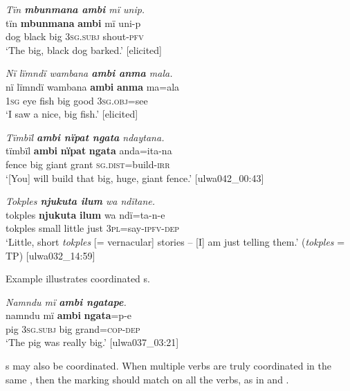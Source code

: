 \ea%
    \label{ex:complex:13}
          \textit{Tïn \textbf{mbunmana ambi} mï unip.}\\
\gll    tïn    \textbf{mbunmana}  \textbf{ambi}  mï      uni-p\\
    dog  black      big    3\textsc{sg.subj}  shout-\textsc{pfv}\\
\glt `The big, black dog barked.’ [elicited]
\z

\ea%
    \label{ex:complex:14}
          \textit{Nï lïmndï wambana \textbf{ambi anma} mala.}\\
\gll    nï    lïmndï  wambana  \textbf{ambi}  \textbf{anma}  ma=ala\\
    1\textsc{sg}  eye    fish    big    good  3\textsc{sg.obj}=see\\
\glt `I saw a nice, big fish.’ [elicited]
\z

\ea%
    \label{ex:complex:15}
          \textit{Tïmbïl \textbf{ambi nïpat ngata} ndaytana.}\\
\gll    tïmbïl  \textbf{ambi}  \textbf{nïpat}  \textbf{ngata}  anda=ita-na\\
    fence  big    giant  grant  \textsc{sg.dist}=build-\textsc{irr}\\
\glt `[You] will build that big, huge, giant fence.’ [ulwa042\_00:43]
\z

\ea%
    \label{ex:complex:16}
          \textit{Tokples \textbf{njukuta ilum} wa ndïtane.}\\
\gll    tokples  \textbf{njukuta}  \textbf{ilum}  wa  ndï=ta-n-e\\
    tokples  small    little  just  3\textsc{pl}=say-\textsc{ipfv-dep}\\
\glt `Little, short \textit{tokples} [= vernacular] stories -- [I] am just telling them.’ (\textit{tokples} = TP) [ulwa032\_14:59]
\z

Example  illustrates coordinated s.

\ea%
    \label{ex:complex:17}
          \textit{Namndu mï \textbf{ambi ngatape}.}\\
\gll namndu  mï      \textbf{ambi}  \textbf{ngata}=p-e\\
    pig      3\textsc{sg.subj}  big    grand=\textsc{cop{}-dep}\\
\glt `The pig was really big.’ [ulwa037\_03:21]
\z

s may also be coordinated. When multiple verbs are truly coordinated in the same , then the  marking should match on all the verbs, as in  and .

